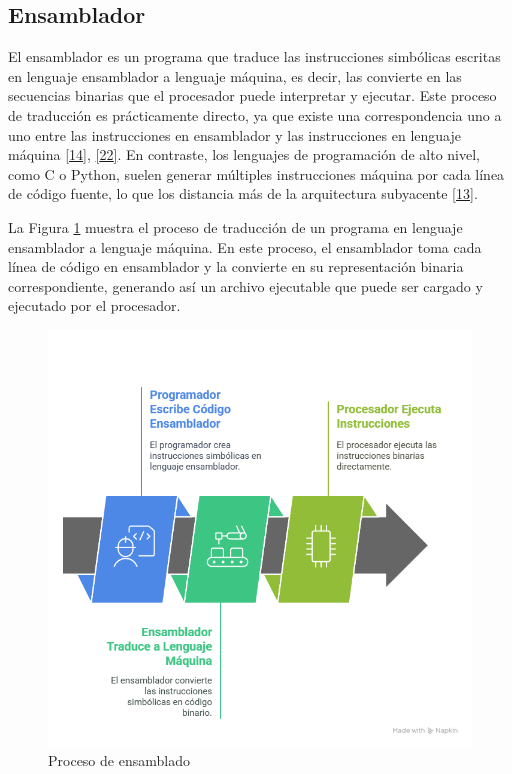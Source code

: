 \documentclass[12pt,oneside]{templates/unerthesis}
\begin{document}
\hypertarget{ensamblador}{%
\subsection{Ensamblador}\label{ensamblador}}

El ensamblador es un programa que traduce las instrucciones simbólicas escritas en lenguaje ensamblador a lenguaje máquina, es decir, las convierte en las secuencias binarias que el procesador puede interpretar y ejecutar. Este proceso de traducción es prácticamente directo, ya que existe una correspondencia uno a uno entre las instrucciones en ensamblador y las instrucciones en lenguaje máquina \protect\hyperlink{ref-stallings_computer_2021}{{[}14{]}}, \protect\hyperlink{ref-tanenbaum_structured_2016}{{[}22{]}}. En contraste, los lenguajes de programación de alto nivel, como C o Python, suelen generar múltiples instrucciones máquina por cada línea de código fuente, lo que los distancia más de la arquitectura subyacente \protect\hyperlink{ref-hennessy2017computer}{{[}13{]}}.

La Figura \ref{fig:ensambla} muestra el proceso de traducción de un programa en lenguaje ensamblador a lenguaje máquina. En este proceso, el ensamblador toma cada línea de código en ensamblador y la convierte en su representación binaria correspondiente, generando así un archivo ejecutable que puede ser cargado y ejecutado por el procesador.

\begin{figure}

{\centering \includegraphics[width=1\linewidth]{images/ensamblador} 

}

\caption{Proceso de ensamblado}\label{fig:ensambla}
\end{figure}
\end{document}

